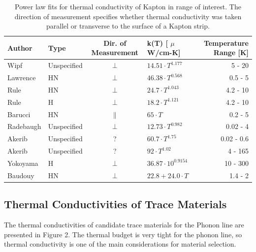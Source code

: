 \documentclass{article}
\begin{document}
\begin{table}[h]
\centering
\begin{threeparttable}
\begin{tabular}{llclr}
\toprule
Author & Type & Dir. of Measurement & k(T) [ $\mu$W/cm-K] & Temperature Range [K]\\
\midrule
Wipf \cite{wip} & Unspecified & $\perp$ & $14.51 \cdot T^{1.177}$ & 5 - 20 \\
Lawrence \cite{law} & HN & $\perp$ & $46.38 \cdot T^{0.568}$ & 0.5 - 5 \\
Rule \cite{Rule1996} & HN & $\perp$ & $24.7 \cdot T^{1.043}$ & 4.2 - 10 \\
Rule \cite{Rule1996} & H & $\perp$ & $18.2 \cdot T^{1.121}$ & 4.2 - 10 \\
Barucci \cite{bar} & HN & $\parallel$ & $65 \cdot T$ & 0.2 - 5 \\
Radebaugh \cite{rad73} & Unspecified & $\perp$ & $12.73 \cdot T^{0.982}$ & 0.02 - 4 \\
Akerib & Unspecified & ? & $60.7 \cdot T^{1.75}$ & 0.02 - 0.6  \\
Akerib & Unspecified & ? & $92 \cdot T^{1.02}$ & 4 - 165 \\
Yokoyama \cite{yok} & H & $\perp$ & $36.87 \cdot 10^{0.9154}$ & 10 - 300 \\
Baudouy \cite{Baudouy2003} & HN & $\perp$ & $22.8 + 24.0 \cdot T$ & 1.4 - 2 \\
\bottomrule
\end{tabular}
\caption{Power law fits for thermal conductivity of Kapton in range of interest. The direction of measurement specifies whether thermal conductivity was taken parallel or transverse to the surface of a Kapton strip.}
\end{threeparttable}
\end{table}


\subsection{Thermal Conductivities of Trace Materials}

The thermal conductivities of candidate trace materials for the Phonon line are presented in Figure 2. The thermal budget is very tight for the phonon line, so thermal conductivity is one of the main considerations for material selection.
\end{document}

